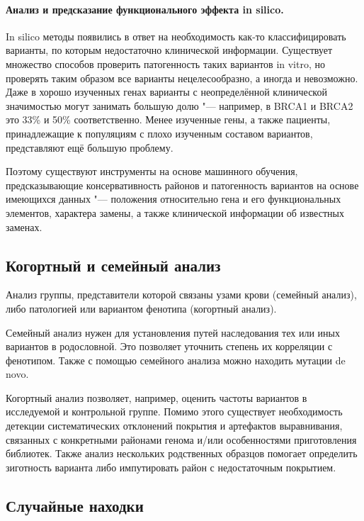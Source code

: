 \documentclass[a4paper,12pt]{article}
\begin{document}
\paragraph{Анализ и предсказание функционального эффекта in silico.}
In silico методы появились в ответ на необходимость как-то классифицировать варианты, по которым недостаточно клинической информации.
Существует множество способов проверить патогенность таких вариантов in vitro, но проверять таким образом все варианты нецелесообразно, а иногда и невозможно.
Даже в хорошо изученных генах варианты с неопределённой клинической значимостью могут занимать большую долю "--- например, в BRCA1 и BRCA2 это 33\% и 50\% соответственно.
Менее изученные гены, а также пациенты, принадлежащие к популяциям с плохо изученным составом вариантов, представляют ещё большую проблему.

Поэтому существуют инструменты на основе машинного обучения, предсказывающие консервативность районов и патогенность вариантов на основе имеющихся данных "--- положения относительно гена и его функциональных элементов, характера замены, а также клинической информации об известных заменах\cite{brea-fernandez}.

\subsection{Когортный и семейный анализ}

Анализ группы, представители которой связаны узами крови (семейный анализ), либо патологией или вариантом фенотипа (когортный анализ).

Семейный анализ нужен для установления путей наследования тех или иных вариантов в родословной.
Это позволяет уточнить степень их корреляции с фенотипом.
Также с помощью семейного анализа можно находить мутации de novo.

Когортный анализ позволяет, например, оценить частоты вариантов в исследуемой и контрольной группе.
Помимо этого существует необходимость детекции систематических отклонений покрытия и артефактов выравнивания, связанных с конкретными районами генома и/или особенностями приготовления библиотек.
Также анализ нескольких родственных образцов помогает определить зиготность варианта либо импутировать район с недостаточным покрытием.

\subsection{Случайные находки}
\end{document}

